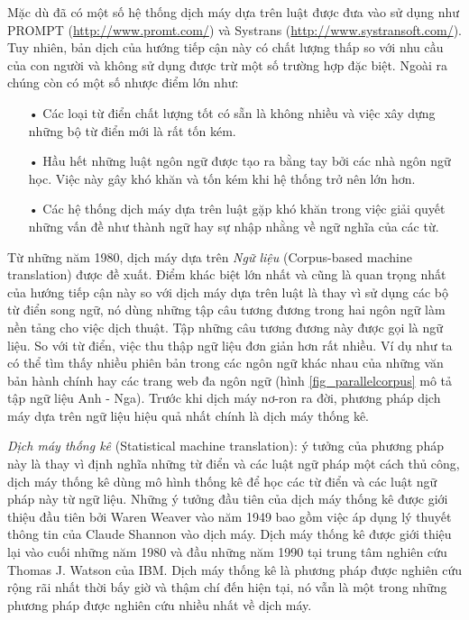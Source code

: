 Mặc dù đã có một số hệ thống dịch máy dựa trên luật được đưa vào sử dụng như PROMPT (\url{http://www.promt.com/}) và Systrans (\url{http://www.systransoft.com/}). Tuy nhiên, bản dịch của hướng tiếp cận này có chất lượng thấp so với nhu cầu của con người và không sử dụng được trừ một số trường hợp đặc biệt. Ngoài ra chúng còn có một số nhược điểm lớn như:
\begin{itemize}
	\item[•] Các loại từ điển chất lượng tốt có sẵn là không nhiều và việc xây dựng những bộ từ điển mới là rất tốn kém.
	\item[•] Hầu hết những luật ngôn ngữ được tạo ra bằng tay bởi các nhà ngôn ngữ học. Việc này gây khó khăn và tốn kém khi hệ thống trở nên lớn hơn.
	\item[•] Các hệ thống dịch máy dựa trên luật gặp khó khăn trong việc giải quyết những vấn đề như thành ngữ hay sự nhập nhằng về ngữ nghĩa của các từ. 
\end{itemize}
Từ những năm 1980, dịch máy dựa trên \textit{Ngữ liệu} (Corpus-based machine translation) được đề xuất. Điểm khác biệt lớn nhất và cũng là quan trọng nhất của hướng tiếp cận này so với dịch máy dựa trên luật là thay vì sử dụng các bộ từ điển song ngữ, nó dùng những tập câu tương đương trong hai ngôn ngữ làm nền tảng cho việc dịch thuật. Tập những câu tương đương này được gọi là ngữ liệu. So với từ điển, việc thu thập ngữ liệu đơn giản hơn rất nhiều. Ví dụ như ta có thể tìm thấy nhiều phiên bản trong các ngôn ngữ khác nhau của những văn bản hành chính hay các trang web đa ngôn ngữ (hình \ref{fig_parallelcorpus} mô tả tập ngữ liệu Anh - Nga). Trước khi dịch máy nơ-ron ra đời, phương pháp dịch máy dựa trên ngữ liệu hiệu quả nhất chính là dịch máy thống kê.

\textit{Dịch máy thống kê} (Statistical machine translation): ý tưởng của phương pháp này là thay vì định nghĩa những từ điển và các luật ngữ pháp một cách thủ công, dịch máy thống kê dùng mô hình thống kê để học các từ điển và các luật ngữ pháp này từ ngữ liệu. Những ý tưởng đầu tiên của dịch máy thống kê được giới thiệu đầu tiên bởi Waren Weaver vào năm 1949 bao gồm việc áp dụng lý thuyết thông tin của Claude Shannon vào dịch máy. Dịch máy thống kê được giới thiệu lại vào cuối những năm 1980 và đầu những năm 1990 tại trung tâm nghiên cứu Thomas J. Watson của IBM. Dịch máy thống kê là phương pháp được nghiên cứu rộng rãi nhất thời bấy giờ và thậm chí đến hiện tại, nó vẫn là một trong những phương pháp được nghiên cứu nhiều nhất về dịch máy. 


